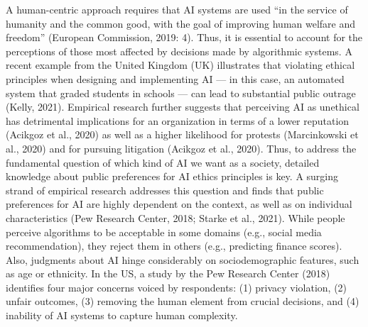 \documentclass{article}
\begin{document}
A human-centric approach requires that AI systems are used ``in the
service of humanity and the common good, with the goal of improving
human welfare and freedom'' (European Commission, 2019: 4). Thus, it is
essential to account for the perceptions of those most affected by
decisions made by algorithmic systems. A recent example from the United
Kingdom (UK) illustrates that violating ethical principles when
designing and implementing AI --- in this case, an automated system that
graded students in schools --- can lead to substantial public outrage
(Kelly, 2021). Empirical research further suggests that perceiving AI as
unethical has detrimental implications for an organization in terms of a
lower reputation (Acikgoz et al., 2020) as well as a higher likelihood
for protests (Marcinkowski et al., 2020) and for pursuing litigation
(Acikgoz et al., 2020). Thus, to address the fundamental question of
which kind of AI we want as a society, detailed knowledge about public
preferences for AI ethics principles is key. A surging strand of
empirical research addresses this question and finds that public
preferences for AI are highly dependent on the context, as well as on
individual characteristics (Pew Research Center, 2018; Starke et al.,
2021). While people perceive algorithms to be acceptable in some domains
(e.g., social media recommendation), they reject them in others (e.g.,
predicting finance scores). Also, judgments about AI hinge considerably
on sociodemographic features, such as age or ethnicity. In the US, a
study by the Pew Research Center (2018) identifies four major concerns
voiced by respondents: (1) privacy violation, (2) unfair outcomes, (3)
removing the human element from crucial decisions, and (4) inability of
AI systems to capture human complexity.
\end{document}

